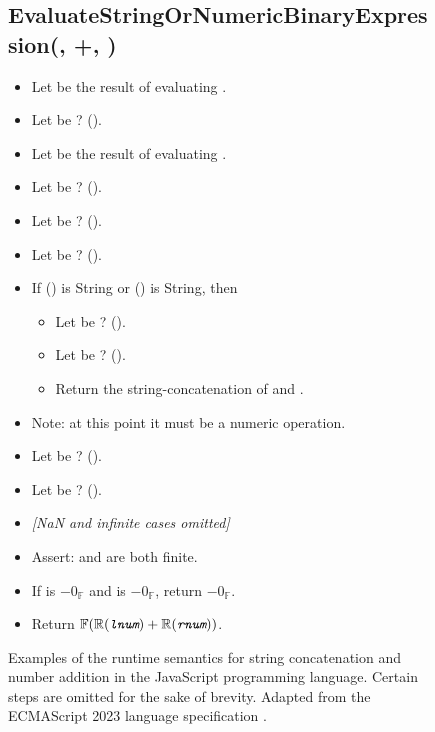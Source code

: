 \begin{figure}
  \subsection*{EvaluateStringOrNumericBinaryExpression(, +, )}
  \begin{itemize}
    \item Let  be the result of evaluating .
    \item Let  be ? ().
    \item Let  be the result of evaluating .
    \item Let  be ? ().
    \item Let  be ? ().
    \item Let  be ? ().
    \item If () is String or () is String, then
    \begin{itemize}
      \item Let  be ? ().
      \item Let  be ? ().
      \item Return the string-concatenation of  and .
    \end{itemize}
    \item Note: at this point it must be a numeric operation.
    \item Let  be ? ().
    \item Let  be ? ().
    \item \textit{[NaN and infinite cases omitted]}
    \item Assert:  and  are both finite.
    \item If  is $ - 0_{\mathbb{F}} $ and  is $ -0_{\mathbb{F}} $, return $ - 0_{\mathbb{F}} $.
    \item Return $ \mathbb{F}(\mathbb{R}(\textit{\texttt{lnum}}) + \mathbb{R}(\textit{\texttt{rnum}})) $.
  \end{itemize}
  \caption{Examples of the runtime semantics for string concatenation and number addition in the JavaScript programming language. Certain steps are omitted for the sake of brevity. Adapted from the ECMAScript 2023 language specification \cite{ecma1999262}.}
  \label{fig:javascript_semantics_example}
\end{figure}

